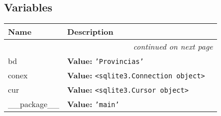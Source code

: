 
  \subsection{Variables}

    \vspace{-1cm}
\hspace{\varindent}\begin{longtable}{|p{\varnamewidth}|p{\vardescrwidth}|l}
\cline{1-2}
\cline{1-2} \centering \textbf{Name} & \centering \textbf{Description}& \\
\cline{1-2}
\endhead\cline{1-2}\multicolumn{3}{r}{\small\textit{continued on next page}}\\\endfoot\cline{1-2}
\endlastfoot\raggedright b\-d\- & \raggedright \textbf{Value:} 
{\tt \texttt{'}\texttt{Provincias}\texttt{'}}&\\
\cline{1-2}
\raggedright c\-o\-n\-e\-x\- & \raggedright \textbf{Value:} 
{\tt {\textless}sqlite3.Connection object{\textgreater}}&\\
\cline{1-2}
\raggedright c\-u\-r\- & \raggedright \textbf{Value:} 
{\tt {\textless}sqlite3.Cursor object{\textgreater}}&\\
\cline{1-2}
\raggedright \_\-\_\-p\-a\-c\-k\-a\-g\-e\-\_\-\_\- & \raggedright \textbf{Value:} 
{\tt \texttt{'}\texttt{main}\texttt{'}}&\\
\cline{1-2}
\end{longtable}

